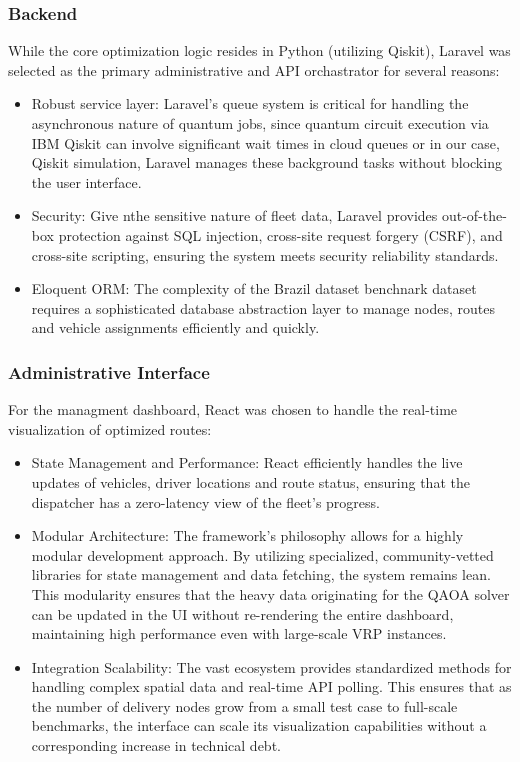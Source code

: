 \documentclass[a4paper]{report}
\begin{document}
{\begin{itemize}
\subsubsection{Backend}
While the core optimization logic resides in Python (utilizing Qiskit), Laravel was selected as the primary administrative and API orchastrator for several reasons:
\begin{itemize}
    \item Robust service layer: Laravel's queue system is critical for handling the asynchronous nature of quantum jobs, since quantum circuit execution via IBM Qiskit can involve significant wait times in cloud queues or in our case, Qiskit simulation, Laravel manages these background tasks without blocking the user interface.
    \item Security: Give nthe sensitive nature of fleet data, Laravel provides out-of-the-box protection against SQL injection, cross-site request forgery (CSRF), and cross-site scripting, ensuring the system meets security reliability standards. 
    \item Eloquent ORM: The complexity of the Brazil dataset benchnark dataset requires a sophisticated database abstraction layer to manage nodes, routes and vehicle assignments efficiently and quickly. 
\end{itemize}



\subsubsection{Administrative Interface}
For the managment dashboard, React was chosen to handle the real-time visualization of optimized routes:
\begin{itemize}
    \item State Management and Performance: React efficiently handles the live updates of vehicles, driver locations and route status, ensuring that the dispatcher has a zero-latency view of the fleet's progress.
    \item Modular Architecture: The framework's philosophy allows for a highly modular development approach. By utilizing specialized, community-vetted libraries for state management and data fetching, the system remains lean. This modularity ensures that the heavy data originating for the QAOA solver can be updated in the UI without re-rendering the entire dashboard, maintaining high performance even with large-scale VRP instances.
    \item Integration Scalability: The vast ecosystem provides standardized methods for handling complex spatial data and real-time API polling. This ensures that as the number of delivery nodes grow from a small test case to full-scale benchmarks, the interface can scale its visualization capabilities without a corresponding increase in technical debt.
\end{itemize}

\end{itemize}}
\end{document}
